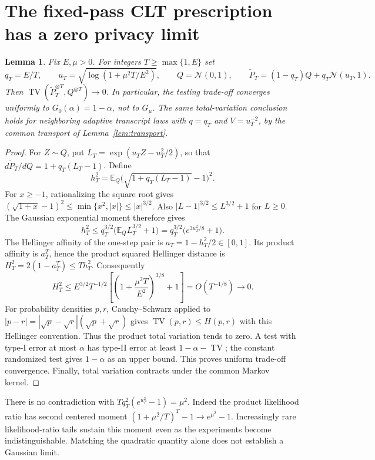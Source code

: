 \documentclass[11pt]{article}
\newtheorem{lemma}[theorem]{Lemma}
\newcommand{\E}{\mathbb E}
\begin{document}
\section{The fixed-pass CLT prescription has a zero privacy limit}
\label{sec:clt-collapse}
\begin{lemma}\label{lem:fixed-pass-clt-collapse}
Fix $E,\mu>0$. For integers $T\ge\max\{1,E\}$ set
\[
 q_T=E/T,\qquad u_T=\sqrt{\log(1+\mu^2T/E^2)},\qquad
 Q=\mathcal N(0,1),\qquad
 \widetilde P_T=(1-q_T)Q+q_T\mathcal N(u_T,1).
\]
Then $\operatorname{TV}(\widetilde P_T^{\otimes T},Q^{\otimes T})\to0$.
In particular, the testing trade-off converges uniformly to
$G_0(\alpha)=1-\alpha$, not to $G_\mu$.
The same total-variation conclusion holds for neighboring adaptive
transcript laws with $q=q_T$ and $V=u_T^{-2}$, by the common transport of
Lemma~\ref{lem:transport}.
\end{lemma}
\begin{proof}
For $Z\sim Q$, put $L_T=\exp(u_T Z-u_T^2/2)$, so that
$d\widetilde P_T/dQ=1+q_T(L_T-1)$. Define
\[
 h_T^2=\E_Q\bigl(\sqrt{1+q_T(L_T-1)}-1\bigr)^2.
\]
For $x\ge-1$, rationalizing the square root gives
$(\sqrt{1+x}-1)^2\le\min\{x^2,|x|\}\le |x|^{3/2}$.
Also $|L-1|^{3/2}\le L^{3/2}+1$ for $L\ge0$.
The Gaussian exponential moment therefore gives
\[
 h_T^2\le q_T^{3/2}\bigl(\E_Q L_T^{3/2}+1\bigr)
       =q_T^{3/2}\bigl(e^{3u_T^2/8}+1\bigr).
\]
The Hellinger affinity of the one-step pair is $a_T=1-h_T^2/2\in[0,1]$.
Its product affinity is $a_T^T$, hence the product squared Hellinger
distance is $H_T^2=2(1-a_T^T)\le T h_T^2$. Consequently
\[
 H_T^2\le E^{3/2}T^{-1/2}
       \left[\left(1+\frac{\mu^2T}{E^2}\right)^{3/8}+1\right]
       =O(T^{-1/8})\longrightarrow0.
\]
For probability densities $p,r$, Cauchy--Schwarz applied to
$|p-r|=|\sqrt p-\sqrt r|(\sqrt p+\sqrt r)$ gives
$\operatorname{TV}(p,r)\le H(p,r)$ with this Hellinger convention.
Thus the product total variation tends to zero. A test with type-I
error at most $\alpha$ has type-II error at least
$1-\alpha-\operatorname{TV}$; the constant randomized test gives
$1-\alpha$ as an upper bound. This proves uniform trade-off convergence.
Finally, total variation contracts under the common Markov kernel.
\end{proof}

There is no contradiction with
$Tq_T^2(e^{u_T^2}-1)=\mu^2$. Indeed the product likelihood ratio has
second centered moment $(1+\mu^2/T)^T-1\to e^{\mu^2}-1$.
Increasingly rare likelihood-ratio tails sustain this moment even as
the experiments become indistinguishable. Matching the quadratic
quantity alone does not establish a Gaussian limit.
\end{document}

